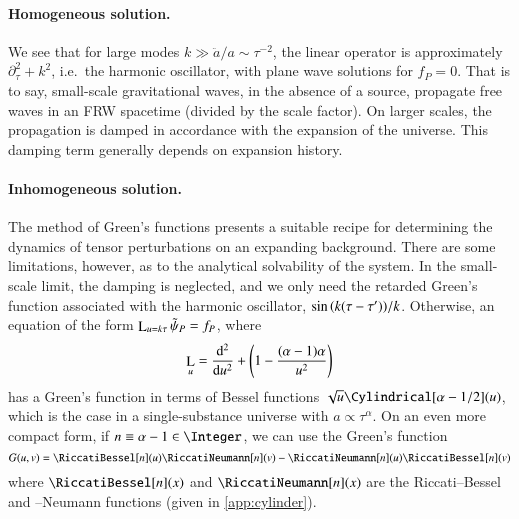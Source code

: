 
    \paragraph{Homogeneous solution.} %
    We see that for large modes $k \gg \ddot{a}/a \sim \tau^{-2}$, the linear operator is approximately $\partial_\tau^2 + k^2$, i.e.~the harmonic oscillator, with plane wave solutions for $f_P=0$. That is to say, small-scale gravitational waves, in the absence of a source, propagate free waves in an FRW spacetime (divided by the scale factor). On larger scales, the propagation is damped in accordance with the expansion of the universe. This damping term generally depends on expansion history.


    


    \paragraph{Inhomogeneous solution.} %
    The method of Green's functions presents a suitable recipe for determining the dynamics of tensor perturbations on an expanding background. There are some limitations, however, as to the analytical solvability of the system. In the small-scale limit, the damping is neglected, and we only need the retarded Green's function associated with the harmonic oscillator, $\sin{{\left( k(\tau-\tau') \right)}}/k$. Otherwise, an equation of the form $\mathop{\mathrm{L}}_{u=k\tau} \tilde{\psi}_P=f_P$, where
    \begin{equation}
        \mathop{\mathrm{L}}_u = \dv[2]{}{u} + {\left( 1 - \frac{(\alpha-1)\alpha}{u^2} \right)}
    \end{equation}
    has a Green's function in terms of Bessel functions $\sqrt{u}\Cylindrical[\alpha-1/2](u)$, which is the case in a single-substance universe with $a \propto \tau^\alpha$. On an even more compact form, if $n\equiv\alpha-1 \in \Integer$, we can use the Green's function
    \begin{equation}\label{eq:GR:gws:Greens_function_n}
        G(u,v) = \RiccatiBessel[n](u)\RiccatiNeumann[n](v) - \RiccatiNeumann[n](u)\RiccatiBessel[n](v)
    \end{equation}
    where $\RiccatiBessel[n](x)$ and $\RiccatiNeumann[n](x)$ are the Riccati--Bessel and --Neumann functions (given in \cref{app:cylinder}).
        
